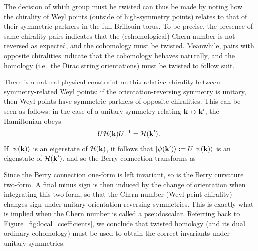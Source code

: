 The decision of which group must be twisted can thus be made by noting how the chirality of Weyl points (outside of high-symmetry points) relates to that of their symmetric partners in the full Brillouin torus. To be precise, the presence of same-chirality pairs indicates that the (cohomological) Chern number is not reversed as expected, and the cohomology must be twisted. Meanwhile, pairs with opposite chiralities indicate that the cohomology behaves naturally, and the homology (i.e.\ the Dirac string orientations) must be twisted to follow suit.

There is a natural physical constraint on this relative chirality between symmetry-related Weyl points: if the orientation-reversing symmetry is unitary, then Weyl points have symmetric partners of opposite chiralities. This can be seen as follows: in the case of a unitary symmetry relating $\vb{k}\leftrightarrow\vb{k}'$, the Hamiltonian obeys
\begin{equation*}
	U\mathcal{H}(\vb{k})U^{-1} = \mathcal{H}(\vb{k}').
\end{equation*}
If $\ket{\psi(\vb{k})}$ is an eigenstate of $\mathcal{H}(\vb{k})$, it follows that $\ket{\psi(\vb{k}')}:=U\ket{\psi(\vb{k})}$ is an eigenstate of $\mathcal{H}(\vb{k}')$, and so the Berry connection transforms as
Since the Berry connection one-form is left invariant, so is the Berry curvature two-form. A final minus sign is then induced by the change of orientation when integrating this two-form, so that the Chern number (Weyl point chirality) changes sign under unitary orientation-reversing symmetries. This is exactly what is implied when the Chern number is called a pseudoscalar. Referring back to Figure~\ref{fig:local_coefficients}, we conclude that twisted homology (and its dual ordinary cohomology) must be used to obtain the correct invariants under unitary symmetries.

